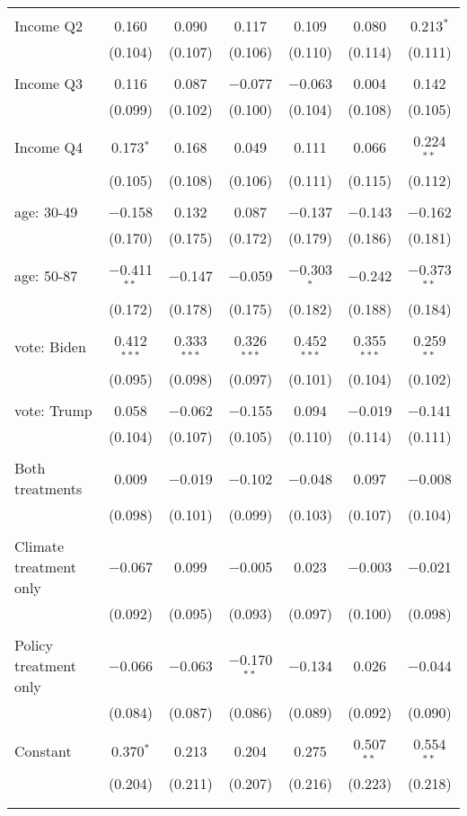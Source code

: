 \begin{tabular}{@{\extracolsep{5pt}}lcccccc}
  & & & & & & \\ 
 Income Q2 & 0.160 & 0.090 & 0.117 & 0.109 & 0.080 & 0.213$^{*}$ \\ 
  & (0.104) & (0.107) & (0.106) & (0.110) & (0.114) & (0.111) \\ 
  & & & & & & \\ 
 Income Q3 & 0.116 & 0.087 & $-$0.077 & $-$0.063 & 0.004 & 0.142 \\ 
  & (0.099) & (0.102) & (0.100) & (0.104) & (0.108) & (0.105) \\ 
  & & & & & & \\ 
 Income Q4 & 0.173$^{*}$ & 0.168 & 0.049 & 0.111 & 0.066 & 0.224$^{**}$ \\ 
  & (0.105) & (0.108) & (0.106) & (0.111) & (0.115) & (0.112) \\ 
  & & & & & & \\ 
 age: 30-49 & $-$0.158 & 0.132 & 0.087 & $-$0.137 & $-$0.143 & $-$0.162 \\ 
  & (0.170) & (0.175) & (0.172) & (0.179) & (0.186) & (0.181) \\ 
  & & & & & & \\ 
 age: 50-87 & $-$0.411$^{**}$ & $-$0.147 & $-$0.059 & $-$0.303$^{*}$ & $-$0.242 & $-$0.373$^{**}$ \\ 
  & (0.172) & (0.178) & (0.175) & (0.182) & (0.188) & (0.184) \\ 
  & & & & & & \\ 
 vote: Biden & 0.412$^{***}$ & 0.333$^{***}$ & 0.326$^{***}$ & 0.452$^{***}$ & 0.355$^{***}$ & 0.259$^{**}$ \\ 
  & (0.095) & (0.098) & (0.097) & (0.101) & (0.104) & (0.102) \\ 
  & & & & & & \\ 
 vote: Trump & 0.058 & $-$0.062 & $-$0.155 & 0.094 & $-$0.019 & $-$0.141 \\ 
  & (0.104) & (0.107) & (0.105) & (0.110) & (0.114) & (0.111) \\ 
  & & & & & & \\ 
 Both treatments & 0.009 & $-$0.019 & $-$0.102 & $-$0.048 & 0.097 & $-$0.008 \\ 
  & (0.098) & (0.101) & (0.099) & (0.103) & (0.107) & (0.104) \\ 
  & & & & & & \\ 
 Climate treatment only & $-$0.067 & 0.099 & $-$0.005 & 0.023 & $-$0.003 & $-$0.021 \\ 
  & (0.092) & (0.095) & (0.093) & (0.097) & (0.100) & (0.098) \\ 
  & & & & & & \\ 
 Policy treatment only & $-$0.066 & $-$0.063 & $-$0.170$^{**}$ & $-$0.134 & 0.026 & $-$0.044 \\ 
  & (0.084) & (0.087) & (0.086) & (0.089) & (0.092) & (0.090) \\ 
  & & & & & & \\ 
 Constant & 0.370$^{*}$ & 0.213 & 0.204 & 0.275 & 0.507$^{**}$ & 0.554$^{**}$ \\ 
  & (0.204) & (0.211) & (0.207) & (0.216) & (0.223) & (0.218) \\ 
  & & & & & & \\ 
\hline \\[-1.8ex] 


\end{tabular}
